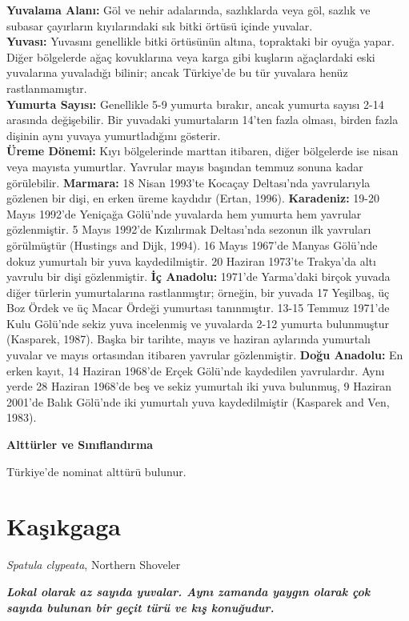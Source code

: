 \documentclass[
  a4paper,
  DIV=11,
  numbers=noendperiod]{scrartcl}
\begin{document}
\textbf{Yuvalama Alanı:} Göl ve nehir adalarında, sazlıklarda veya göl,
sazlık ve subasar çayırların kıyılarındaki sık bitki örtüsü içinde
yuvalar.\\
\textbf{Yuvası:} Yuvasını genellikle bitki örtüsünün altına, topraktaki
bir oyuğa yapar. Diğer bölgelerde ağaç kovuklarına veya karga gibi
kuşların ağaçlardaki eski yuvalarına yuvaladığı bilinir; ancak
Türkiye'de bu tür yuvalara henüz rastlanmamıştır.\\
\textbf{Yumurta Sayısı:} Genellikle 5-9 yumurta bırakır, ancak yumurta
sayısı 2-14 arasında değişebilir. Bir yuvadaki yumurtaların 14'ten fazla
olması, birden fazla dişinin aynı yuvaya yumurtladığını gösterir.\\
\textbf{Üreme Dönemi:} Kıyı bölgelerinde marttan itibaren, diğer
bölgelerde ise nisan veya mayısta yumurtlar. Yavrular mayıs başından
temmuz sonuna kadar görülebilir. \textbf{Marmara:} 18 Nisan 1993'te
Kocaçay Deltası'nda yavrularıyla gözlenen bir dişi, en erken üreme
kaydıdır (Ertan, 1996). \textbf{Karadeniz:} 19-20 Mayıs 1992'de Yeniçağa
Gölü'nde yuvalarda hem yumurta hem yavrular gözlenmiştir. 5 Mayıs
1992'de Kızılırmak Deltası'nda sezonun ilk yavruları görülmüştür
(Hustings and Dijk, 1994). 16 Mayıs 1967'de Manyas Gölü'nde dokuz
yumurtalı bir yuva kaydedilmiştir. 20 Haziran 1973'te Trakya'da altı
yavrulu bir dişi gözlenmiştir. \textbf{İç Anadolu:} 1971'de Yarma'daki
birçok yuvada diğer türlerin yumurtalarına rastlanmıştır; örneğin, bir
yuvada 17 Yeşilbaş, üç Boz Ördek ve üç Macar Ördeği yumurtası
tanınmıştır. 13-15 Temmuz 1971'de Kulu Gölü'nde sekiz yuva incelenmiş ve
yuvalarda 2-12 yumurta bulunmuştur (Kasparek, 1987). Başka bir tarihte,
mayıs ve haziran aylarında yumurtalı yuvalar ve mayıs ortasından
itibaren yavrular gözlenmiştir. \textbf{Doğu Anadolu:} En erken kayıt,
14 Haziran 1968'de Erçek Gölü'nde kaydedilen yavrulardır. Aynı yerde 28
Haziran 1968'de beş ve sekiz yumurtalı iki yuva bulunmuş, 9 Haziran
2001'de Balık Gölü'nde iki yumurtalı yuva kaydedilmiştir (Kasparek and
Ven, 1983).

\textbf{Alttürler ve Sınıflandırma}

Türkiye'de nominat alttürü bulunur.

\section{Kaşıkgaga}\label{kaux15fux131kgaga}

\emph{Spatula clypeata}, Northern Shoveler

\textbf{\emph{Lokal olarak az sayıda yuvalar. Aynı zamanda yaygın olarak
çok sayıda bulunan bir geçit türü ve kış konuğudur.}}
\end{document}
